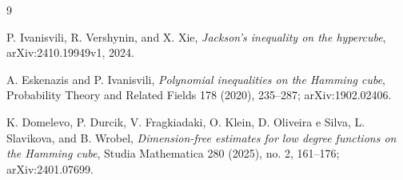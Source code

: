 \documentclass[11pt]{article}
\begin{document}
\enlargethispage{4\baselineskip}
\small
\begin{thebibliography}{9}

P. Ivanisvili, R. Vershynin, and X. Xie,
\emph{Jackson's inequality on the hypercube},
arXiv:2410.19949v1, 2024.

A. Eskenazis and P. Ivanisvili,
\emph{Polynomial inequalities on the Hamming cube},
Probability Theory and Related Fields 178 (2020), 235--287;
arXiv:1902.02406.

K. Domelevo, P. Durcik, V. Fragkiadaki, O. Klein,
D. Oliveira e Silva, L. Slavikova, and B. Wrobel,
\emph{Dimension-free estimates for low degree functions on the Hamming cube},
Studia Mathematica 280 (2025), no. 2, 161--176;
arXiv:2401.07699.

\end{thebibliography}
\end{document}
